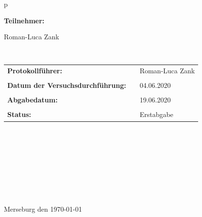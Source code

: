 \begin{center}
\begin{tabular}{p{\textwidth}}
\begin{center}
\Large{\textbf{Teilnehmer:}} \\ 
\end{center}
\begin{center}
\large{Roman-Luca Zank}
\end{center}


\\

\begin{center}
\begin{tabular}{lll}
\large{\textbf{Protokollführer:}} & &  \large{Roman-Luca Zank}\\
&&\\
\large{\textbf{Datum der Versuchsdurchführung:}}&& \large{04.06.2020}\\
&&\\
\large{\textbf{Abgabedatum:}}&& \large{19.06.2020}\\
&&\\
\large{\textbf{Status:}}&& \large{Erstabgabe}\\
\end{tabular}
\end{center}

\\ \\ \\ \\ \\ \\ \\ \\
\large{Merseburg den \today}

\end{tabular}
\end{center}
